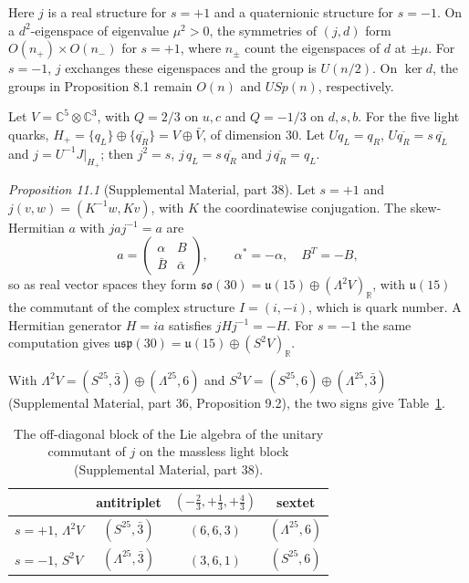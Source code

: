 \documentclass[aps,prd,reprint,onecolumn,nofootinbib,amsmath,amssymb,floatfix]{revtex4-2}
\theoremstyle{plain}
\newcommand{\C}{\mathbb C}
\newcommand{\supp}[1]{Supplemental Material, part #1}
\begin{document}
Here $j$ is a real structure for $s=+1$ and a quaternionic structure for $s=-1$. On a $d^2$-eigenspace of eigenvalue $\mu^2>0$, the symmetries of $(j,d)$ form $O(n_+)\times O(n_-)$ for $s=+1$, where $n_\pm$ count the eigenspaces of $d$ at $\pm\mu$. For $s=-1$, $j$ exchanges these eigenspaces and the group is $U(n/2)$. On $\ker d$, the groups in Proposition 8.1 remain $O(n)$ and $USp(n)$, respectively.

Let $V=\C^5\otimes\C^3$, with $Q=2/3$ on $u,c$ and $Q=-1/3$ on $d,s,b$. For the five light quarks, $H_+=\{q_L\}\oplus\{\overline{q_R}\}=V\oplus\bar V$, of dimension 30. Let $Uq_L=q_R$, $U\overline{q_R}=s\,\overline{q_L}$ and $j=U^{-1}J|_{H_+}$; then $j^2=s$, $j\,q_L=s\,\overline{q_R}$ and $j\,\overline{q_R}=q_L$.

\smallskip\noindent\textit{Proposition 11.1} (\supp{38}). Let $s=+1$ and $j(v,w)=(K^{-1}w,Kv)$, with $K$ the coordinatewise conjugation. The skew-Hermitian $a$ with $jaj^{-1}=a$ are
\begin{equation}\label{eq:block}
a=\begin{pmatrix}\alpha&B\\ \bar B&\bar\alpha\end{pmatrix},\qquad\alpha^*=-\alpha,\quad B^T=-B,
\end{equation}
so as real vector spaces they form $\mathfrak{so}(30)=\mathfrak u(15)\oplus(\Lambda^2V)_{\mathbb R}$, with $\mathfrak u(15)$ the commutant of the complex structure $I=(i,-i)$, which is quark number. A Hermitian generator $H=ia$ satisfies $jHj^{-1}=-H$. For $s=-1$ the same computation gives $\mathfrak{usp}(30)=\mathfrak u(15)\oplus(S^2V)_{\mathbb R}$.
\smallskip

With $\Lambda^2V=(S^25,\bar3)\oplus(\Lambda^25,6)$ and $S^2V=(S^25,6)\oplus(\Lambda^25,\bar3)$ (\supp{36}, Proposition 9.2), the two signs give Table~\ref{tab:counts}.

\begin{table}
\caption{\label{tab:counts}The off-diagonal block of the Lie algebra of the unitary commutant of $j$ on the massless light block (\supp{38}).}
\begin{ruledtabular}
\begin{tabular}{lccc}
&antitriplet&$(-\frac23,+\frac13,+\frac43)$&sextet\\
\hline
$s=+1$, $\Lambda^2V$&$(S^25,\bar3)$&$(6,6,3)$&$(\Lambda^25,6)$\\
$s=-1$, $S^2V$&$(\Lambda^25,\bar3)$&$(3,6,1)$&$(S^25,6)$\\
\end{tabular}
\end{ruledtabular}
\end{table}
\end{document}
